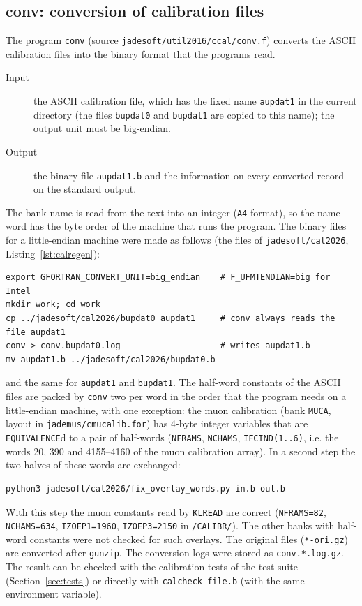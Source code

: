 \subsection{conv: conversion of calibration files}
\label{sec:calconv}
The program \texttt{conv} (source \texttt{jadesoft/\allowbreak{}util2016/\allowbreak{}ccal/\allowbreak{}conv.f}) converts the ASCII calibration files into the binary format that the programs read.
\begin{description}
\item[Input] the ASCII calibration file, which has the fixed name \texttt{aupdat1} in the current directory (the files \texttt{bupdat0} and \texttt{bupdat1} are copied to this
name); the output unit must be big-endian.
\item[Output] the binary file \texttt{aupdat1.b} and the information on every converted record on the standard output.
\end{description}
The bank name is read from the text into an integer (\texttt{A4} format), so the name word has the byte order of the machine that runs the program. The binary files for a
little-endian machine were made as follows (the files of \texttt{jadesoft/\allowbreak{}cal2026}, Listing~\ref{lst:calregen}):
\begin{lstlisting}[caption={Regeneration of a binary calibration file for a little-endian host.},label={lst:calregen}]
export GFORTRAN_CONVERT_UNIT=big_endian    # F_UFMTENDIAN=big for Intel
mkdir work; cd work
cp ../jadesoft/cal2026/bupdat0 aupdat1     # conv always reads the file aupdat1
conv > conv.bupdat0.log                    # writes aupdat1.b
mv aupdat1.b ../jadesoft/cal2026/bupdat0.b
\end{lstlisting}
and the same for \texttt{aupdat1} and \texttt{bupdat1}. The half-word constants of the ASCII files are
packed by \texttt{conv} two per word in the order that the program needs on a little-endian machine,
with one exception: the muon calibration (bank \texttt{MUCA}, layout in \texttt{jademus/\allowbreak{}cmucalib.for})
has 4-byte integer variables that are \texttt{EQUIVALENCE}d to a pair of half-words (\texttt{NFRAMS},
\texttt{NCHAMS}, \texttt{IFCIND(1..6)}, i.e. the words 20, 390 and 4155--4160 of the muon calibration
array). In a second step the two halves of these words are exchanged:
\begin{lstlisting}
python3 jadesoft/cal2026/fix_overlay_words.py in.b out.b
\end{lstlisting}
With this step the muon
constants read by \texttt{KLREAD} are correct (\texttt{NFRAMS=82}, \texttt{NCHAMS=634},
\texttt{IZOEP1=1960}, \texttt{IZOEP3=2150} in \texttt{/CALIBR/}). The other banks with half-word
constants were not checked for such overlays. The original files
(\texttt{*-ori.gz}) are converted after \texttt{gunzip}. The conversion logs were stored as
\texttt{conv.*.log.gz}. The result can be checked with the calibration tests of the test
suite (Section~\ref{sec:tests}) or directly with \texttt{calcheck file.b} (with the same environment variable).

